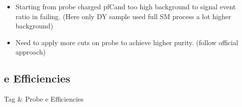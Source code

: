 \documentclass{beamer}
\begin{document}
\begin{frame}
\begin{columns}
\begin{column}{0.33\textwidth}
   \end{column}
  \end{columns}
\begin{itemize}
 \item Starting from probe charged pfCand too high background to signal event ratio in failing. (Here only DY sample used full SM process a lot higher background)
 \item Need to apply more cuts on probe to achieve higher purity. (follow official approach)
\end{itemize}
\end{frame}
\subsection{e Efficiencies}
\begin{frame}
 \begin{block}{}
 \centering
 \Large Tag \& Probe e Efficiencies
 \end{block}
\end{frame}
\end{document}
